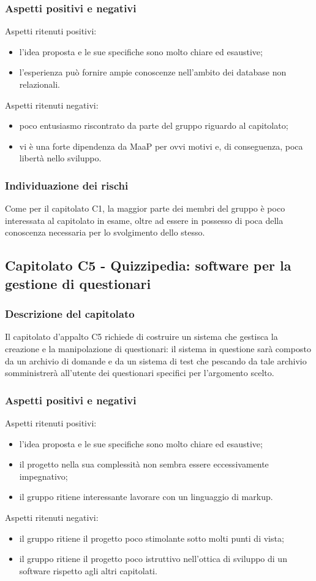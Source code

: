 \documentclass[../StudioDiFattibilita.tex]{subfiles}
\begin{document}
		\subsubsection{Aspetti positivi e negativi}
		Aspetti ritenuti positivi:
			\begin{itemize}
				\item l'idea proposta e le sue specifiche sono molto chiare ed esaustive;
				\item l'esperienza può fornire ampie conoscenze nell'ambito dei database non relazionali.
			\end{itemize}
		Aspetti ritenuti negativi:
			\begin{itemize}
				\item poco entusiasmo riscontrato da parte del gruppo riguardo al capitolato;
				\item vi è una forte dipendenza da MaaP per ovvi motivi e, di conseguenza, poca libertà nello sviluppo.
			\end{itemize}
		\subsubsection{Individuazione dei rischi}
		Come per il capitolato C1, la maggior parte dei membri del gruppo è poco interessata al capitolato in esame, oltre ad essere in possesso di poca della conoscenza necessaria per lo svolgimento dello stesso.
	\subsection{Capitolato C5 - Quizzipedia: software per la gestione di questionari}
		\subsubsection{Descrizione del capitolato}
		Il capitolato d'appalto C5 richiede di costruire un sistema che gestisca la creazione e la manipolazione di questionari: il sistema in questione sarà composto da un archivio di domande e da un sistema di test che pescando da tale archivio somministrerà all'utente dei questionari specifici per l'argomento scelto.
		\subsubsection{Aspetti positivi e negativi}
		Aspetti ritenuti positivi:
			\begin{itemize}
				\item l'idea proposta e le sue specifiche sono molto chiare ed esaustive;
				\item il progetto nella sua complessità non sembra essere eccessivamente impegnativo;
				\item il gruppo ritiene interessante lavorare con un linguaggio di markup.
			\end{itemize}
		Aspetti ritenuti negativi:
			\begin{itemize}
				\item il gruppo ritiene il progetto poco stimolante sotto molti punti di vista;
				\item il gruppo ritiene il progetto poco istruttivo nell'ottica di sviluppo di un software rispetto agli altri capitolati.
			\end{itemize}
\end{document}
